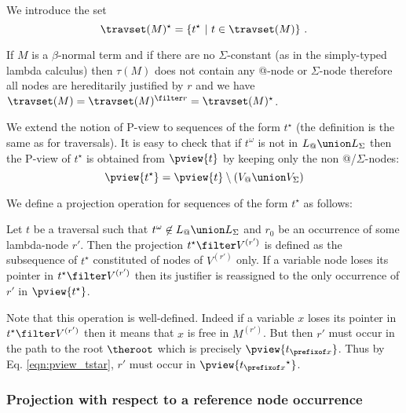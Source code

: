 We introduce the set
$$\travset(M)^\star = \{ t^\star \ | \  t \in \travset(M) \} \ .$$

\begin{remark}
If $M$ is a $\beta$-normal term and if there are no
$\Sigma$-constant (as in the simply-typed lambda calculus) then
$\tau(M)$ does not contain any @-node or $\Sigma$-node therefore all
nodes are hereditarily justified by $r$ and we have $\travset(M) =
\travset(M)^{\filter r} = \travset(M)^\star$.
\end{remark}


We extend the notion of P-view to sequences of the form $t^\star$
(the definition is the same as for traversals). It is easy to check
that if $t^\omega$ is not in $L_@ \union L_\Sigma$ then the P-view
of $t^\star$ is obtained from $\pview{t}$ by keeping only the non
@/$\Sigma$-nodes:
\begin{equation}
 \pview{t^\star} = \pview{t} \setminus (V_@ \union V_\Sigma) \label{eqn:pview_tstar}
\end{equation}

We define a projection operation for sequences of the form $t^\star$
as follows:
\begin{definition}
\label{def:subterm_trav_projection}
  Let $t$ be a traversal such that $t^\omega\not\in L_@ \union L_\Sigma$ and $r_0$ be an occurrence of some
lambda-node $r'$. Then the projection $t^\star \filter V^{(r')}$ is
defined as the subsequence of $t^\star$ constituted of nodes of
$V^{(r')}$ only. If a variable node loses its pointer in $t^\star
\filter V^{(r')}$ then its justifier is reassigned to the only
occurrence of $r'$ in $\pview{t^\star}$.
\end{definition}
Note that this operation is well-defined. Indeed if a variable $x$
loses its pointer in $t^\star \filter V^{(r')}$ then it means that
$x$ is free in $M^{(r')}$. But then $r'$ must occur in the path to
the root $\theroot$ which is precisely $\pview{t_{\prefixof x}}$.
Thus by Eq. \ref{eqn:pview_tstar}, $r'$ must occur in
$\pview{{t_{\prefixof x}}^\star}$.



\subsubsection{Projection with respect to a reference node occurrence}
\label{sec:tstar}

